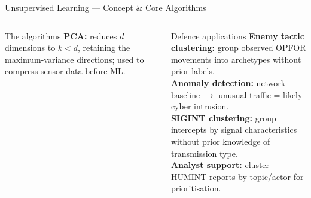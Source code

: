 \documentclass[aspectratio=169,10pt,t]{beamer}
\begin{document}
\begin{frame}{Unsupervised Learning --- Concept \& Core Algorithms}
\begin{columns}[T]
\begin{cbox}{The algorithms}
\textbf{PCA:} reduces $d$ dimensions to $k<d$, retaining the maximum-variance directions; used to compress sensor data before ML.
\end{cbox}
\begin{cbox}[ISSAgrn]{Defence applications}\scriptsize
\textbf{Enemy tactic clustering:} group observed OPFOR movements into archetypes without prior labels.\\
\textbf{Anomaly detection:} network baseline $\to$ unusual traffic = likely cyber intrusion.\\
\textbf{SIGINT clustering:} group intercepts by signal characteristics without prior knowledge of transmission type.\\
\textbf{Analyst support:} cluster HUMINT reports by topic/actor for prioritisation.\end{cbox}

\end{columns}
\end{frame}
\end{document}
